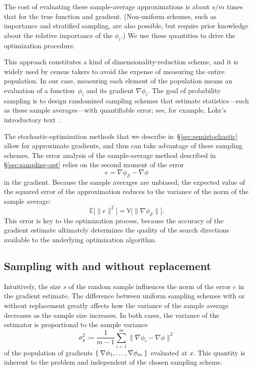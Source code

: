 \documentclass[nospthms]{svjour3}
\numberwithin{equation}{section}
\def\norm#1{\|#1\|}
\def\Sscr{\mathcal{S}}
\def\expval{\mathbb{E}}
\def\var{\mathbb{V}}
\def\sample{\Sscr}
\def\phis{\phi_{\scriptscriptstyle\sample}}
\begin{document}
The cost of evaluating these sample-average approximations is about
$s/m$ times that for the true function and gradient.  (Non-uniform
schemes, such as importance and stratified sampling, are also
possible, but require prior knowledge about the relative importance of
the $\phi_i$.)  We use these quantities to drive the optimization
procedure.

This approach constitutes a kind of dimensionality-reduction scheme,
and it is widely used by census takers to avoid the expense of
measuring the entire population. In our case, measuring each element of
the population means an evaluation of a function~$\phi_i$ and its
gradient $\nabla\phi_i$. The goal of probability sampling is to design
randomized sampling schemes that estimate statistics---such as these
sample averages---with quantifiable error; see, for example, Lohr's
introductory text~\cite{lohr1999sampling}.

The stochastic-optimization methods that we describe
in~\S\ref{sec:semistochastic} allow for approximate gradients, and thus
can take advantage of these sampling schemes. The error analysis of
the sample-average method described in \S\ref{sec:sampling-opt} relies
on the second moment of the error
\begin{equation} \label{eq:sample-e}
 e = \nabla\phis - \nabla\phi
\end{equation}
in the gradient.  Because the sample averages are unbiased, the
expected value of the squared error of the approximation reduces to
the variance of the norm of the sample average:
\begin{equation} \label{eq:var-sample-avg}
\expval\big[\norm{e}^2\big] = \var\big[ \norm{\nabla\phis} \big].
\end{equation}
This error is key to the optimization process, because the accuracy of
the gradient estimate ultimately determines the quality
of the search directions available to the underlying optimization
algorithm.

\subsection{Sampling with and without replacement}

Intuitively, the size $s$ of the random sample influences the norm of
the error $e$ in the gradient estimate. The difference between uniform
sampling schemes with or without replacement greatly affects how the
variance of the sample average decreases as the sample size
increases. In both cases, the variance of the estimator is
proportional to the sample variance
\begin{equation} \label{FiniteGradientSampleVariance}
 \sigma_g^2 := \frac{1}{m-1}\sum_{i=1}^m \norm{\nabla\phi_i - \nabla\phi}^2
\end{equation}
of the population of gradients $\Set{\nabla\phi_1,\ldots,
  \nabla\phi_m}$ evaluated at $x$.  This quantity is inherent to the
problem and independent of the chosen sampling scheme.
\end{document}
